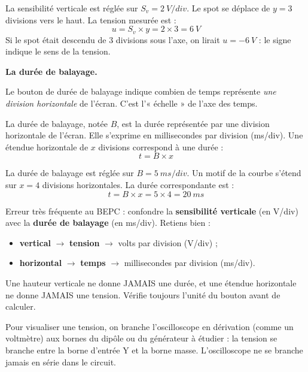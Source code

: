 \documentclass[11pt]{article}
\newcommand{\cle}[1]{{\popxbold\color{popdark}#1}}
\newcounter{popsec}
\newcounter{popsub}
\newcommand{\courssub}[1]{%
  \stepcounter{popsub}%
  \par\vspace{9pt}\noindent{\popxbold\fontsize{11.5}{13}\selectfont\color{popink}{\color{poporange}\thepopsec.\thepopsub}\hspace{6pt}#1}\par\nopagebreak\vspace{4pt}
}
\begin{document}
\begin{exemplebox}
La sensibilité verticale est réglée sur $S_v = \SI{2}{V/div}$. Le spot se déplace de $y = 3$ divisions vers le haut. La tension mesurée est :
\[ u = S_v \times y = 2 \times 3 = \SI{6}{V} \]
Si le spot était descendu de 3 divisions sous l'axe, on lirait $u = \SI{-6}{V}$ : le signe indique le sens de la tension.
\end{exemplebox}

\textbf{La durée de balayage.}\par
Le bouton de durée de balayage indique combien de temps représente \emph{une division horizontale} de l'écran. C'est l'« échelle » de l'axe des temps.

\begin{definition}
La \cle{durée de balayage}, notée $B$, est la durée représentée par une division horizontale de l'écran. Elle s'exprime en millisecondes par division (ms/div). Une étendue horizontale de $x$ divisions correspond à une durée :
\[ t = B \times x \]
\end{definition}

\begin{exemplebox}
La durée de balayage est réglée sur $B = \SI{5}{ms/div}$. Un motif de la courbe s'étend sur $x = 4$ divisions horizontales. La durée correspondante est :
\[ t = B \times x = 5 \times 4 = \SI{20}{ms} \]
\end{exemplebox}

\begin{attention}
Erreur très fréquente au BEPC : confondre la \textbf{sensibilité verticale} (en V/div) avec la \textbf{durée de balayage} (en ms/div). Retiens bien :
\begin{itemize}
\item \textbf{vertical} $\rightarrow$ \textbf{tension} $\rightarrow$ volts par division (V/div) ;
\item \textbf{horizontal} $\rightarrow$ \textbf{temps} $\rightarrow$ millisecondes par division (ms/div).
\end{itemize}
Une hauteur verticale ne donne JAMAIS une durée, et une étendue horizontale ne donne JAMAIS une tension. Vérifie toujours l'unité du bouton avant de calculer.
\end{attention}

\courssub{Branchement de l'oscilloscope}

\begin{propriete}
Pour visualiser une tension, on branche l'oscilloscope \cle{en dérivation} (comme un voltmètre) aux bornes du dipôle ou du générateur à étudier : la tension se branche entre la borne d'entrée \cle{Y} et la borne \cle{masse}. L'oscilloscope ne se branche jamais en série dans le circuit.
\end{propriete}
\end{document}
